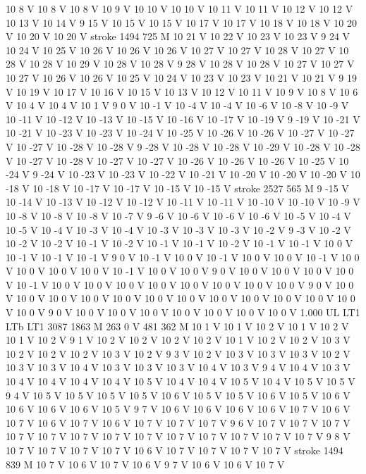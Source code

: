 {{10 8 V
10 8 V
10 8 V
10 9 V
10 10 V
10 10 V
10 11 V
10 11 V
10 12 V
10 12 V
10 13 V
10 14 V
9 15 V
10 15 V
10 15 V
10 17 V
10 17 V
10 18 V
10 18 V
10 20 V
10 20 V
10 20 V
stroke
1494 725 M
10 21 V
10 22 V
10 23 V
10 23 V
9 24 V
10 24 V
10 25 V
10 26 V
10 26 V
10 26 V
10 27 V
10 27 V
10 28 V
10 27 V
10 28 V
10 28 V
10 29 V
10 28 V
10 28 V
9 28 V
10 28 V
10 28 V
10 27 V
10 27 V
10 27 V
10 26 V
10 26 V
10 25 V
10 24 V
10 23 V
10 23 V
10 21 V
10 21 V
9 19 V
10 19 V
10 17 V
10 16 V
10 15 V
10 13 V
10 12 V
10 11 V
10 9 V
10 8 V
10 6 V
10 4 V
10 4 V
10 1 V
9 0 V
10 -1 V
10 -4 V
10 -4 V
10 -6 V
10 -8 V
10 -9 V
10 -11 V
10 -12 V
10 -13 V
10 -15 V
10 -16 V
10 -17 V
10 -19 V
9 -19 V
10 -21 V
10 -21 V
10 -23 V
10 -23 V
10 -24 V
10 -25 V
10 -26 V
10 -26 V
10 -27 V
10 -27 V
10 -27 V
10 -28 V
10 -28 V
9 -28 V
10 -28 V
10 -28 V
10 -29 V
10 -28 V
10 -28 V
10 -27 V
10 -28 V
10 -27 V
10 -27 V
10 -26 V
10 -26 V
10 -26 V
10 -25 V
10 -24 V
9 -24 V
10 -23 V
10 -23 V
10 -22 V
10 -21 V
10 -20 V
10 -20 V
10 -20 V
10 -18 V
10 -18 V
10 -17 V
10 -17 V
10 -15 V
10 -15 V
stroke
2527 565 M
9 -15 V
10 -14 V
10 -13 V
10 -12 V
10 -12 V
10 -11 V
10 -11 V
10 -10 V
10 -10 V
10 -9 V
10 -8 V
10 -8 V
10 -8 V
10 -7 V
9 -6 V
10 -6 V
10 -6 V
10 -6 V
10 -5 V
10 -4 V
10 -5 V
10 -4 V
10 -3 V
10 -4 V
10 -3 V
10 -3 V
10 -3 V
10 -2 V
9 -3 V
10 -2 V
10 -2 V
10 -2 V
10 -1 V
10 -2 V
10 -1 V
10 -1 V
10 -2 V
10 -1 V
10 -1 V
10 0 V
10 -1 V
10 -1 V
10 -1 V
9 0 V
10 -1 V
10 0 V
10 -1 V
10 0 V
10 0 V
10 -1 V
10 0 V
10 0 V
10 0 V
10 0 V
10 -1 V
10 0 V
10 0 V
9 0 V
10 0 V
10 0 V
10 0 V
10 0 V
10 -1 V
10 0 V
10 0 V
10 0 V
10 0 V
10 0 V
10 0 V
10 0 V
10 0 V
9 0 V
10 0 V
10 0 V
10 0 V
10 0 V
10 0 V
10 0 V
10 0 V
10 0 V
10 0 V
10 0 V
10 0 V
10 0 V
10 0 V
9 0 V
10 0 V
10 0 V
10 0 V
10 0 V
10 0 V
10 0 V
10 0 V
1.000 UL
LT1
LTb
LT1
3087 1863 M
263 0 V
481 362 M
10 1 V
10 1 V
10 2 V
10 1 V
10 2 V
10 1 V
10 2 V
9 1 V
10 2 V
10 2 V
10 2 V
10 2 V
10 1 V
10 2 V
10 2 V
10 3 V
10 2 V
10 2 V
10 2 V
10 3 V
10 2 V
9 3 V
10 2 V
10 3 V
10 3 V
10 3 V
10 2 V
10 3 V
10 3 V
10 4 V
10 3 V
10 3 V
10 3 V
10 4 V
10 3 V
9 4 V
10 4 V
10 3 V
10 4 V
10 4 V
10 4 V
10 4 V
10 5 V
10 4 V
10 4 V
10 5 V
10 4 V
10 5 V
10 5 V
9 4 V
10 5 V
10 5 V
10 5 V
10 5 V
10 6 V
10 5 V
10 5 V
10 6 V
10 5 V
10 6 V
10 6 V
10 6 V
10 6 V
10 5 V
9 7 V
10 6 V
10 6 V
10 6 V
10 6 V
10 7 V
10 6 V
10 7 V
10 6 V
10 7 V
10 6 V
10 7 V
10 7 V
10 7 V
9 6 V
10 7 V
10 7 V
10 7 V
10 7 V
10 7 V
10 7 V
10 7 V
10 7 V
10 7 V
10 7 V
10 7 V
10 7 V
10 7 V
9 8 V
10 7 V
10 7 V
10 7 V
10 7 V
10 6 V
10 7 V
10 7 V
10 7 V
10 7 V
stroke
1494 839 M
10 7 V
10 6 V
10 7 V
10 6 V
9 7 V
10 6 V
10 6 V
10 7 V
}}
